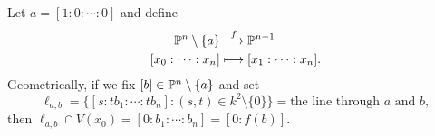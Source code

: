 \begin{example}[Projections]
  Let $a = [1 : 0 : \cdots : 0]$
  and define
  \begin{align*}
    \mathbb{P}^n \setminus \{a\}
    &\overset{f}{\longrightarrow}
    \mathbb{P}^{n - 1} \\
    [x_0 : \cdots : x_n]
    &\longmapsto
    [x_1 : \cdots : x_n].
  \end{align*}
  Geometrically, if we fix
  $[b] \in \mathbb{P}^n \setminus \{a\}$
  and set
  \[
    \ell_{a, b}
    = \{
      [s : tb_1 : \cdots : tb_n]
      : (s, t) \in k^2 \setminus \{0\}
    \}
    = \text{the line through $a$ and $b$},
  \]
  then $\ell_{a, b} \cap V(x_0) = [0 : b_1 : \cdots : b_n] = [0 : f(b)]$.
\end{example}
